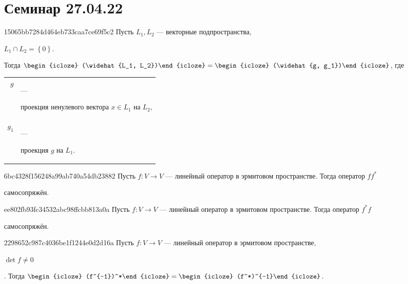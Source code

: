 \section{Семинар 27.04.22}
\begin{note}{15065bb7284d464eb733caa7ce69f5c2}
    Пусть \({ L_1, L_2 }\) --- векторные подпространства,\: \begin{icloze}{5}\({ L_1 \cap L_2 = \left\{ 0 \right\} }\).\end{icloze}
    Тогда \({ \begin{icloze}{4}(\widehat{L_1, L_2})\end{icloze} = \begin{icloze}{3}(\widehat{g, g_1})\end{icloze} }\), где
    \begin{center}
        \begin{tabular}{rl}
            \({ g }\) &--- \begin{icloze}{1}проекция ненулевого вектора \({ x \in L_1 }\) на \({ L_2 }\),\end{icloze} \\
            \({ g_1 }\) &--- \begin{icloze}{2}проекция \({ g }\) на \({ L_1 }\).\end{icloze}
        \end{tabular}
    \end{center}
\end{note}

\begin{note}{6bc4328f156248a99ab740a54db23882}
    Пусть \({ f : V \to V }\) --- линейный оператор в эрмитовом пространстве.
    Тогда оператор \({ ff^* }\) \begin{icloze}{1}самосопряжён.\end{icloze}
\end{note}

\begin{note}{ee802fb93fc34532abc98ffcbb813a0a}
    Пусть \({ f : V \to V }\) --- линейный оператор в эрмитовом пространстве.
    Тогда оператор \({ f^*f }\) \begin{icloze}{1}самосопряжён.\end{icloze}
\end{note}

\begin{note}{2298652c987c4036be1f1244e0d2d16a}
    Пусть \({ f : V \to V }\) --- линейный оператор в эрмитовом пространстве,\: \begin{icloze}{3}\({ \det f \neq 0 }\)\end{icloze}.
    Тогда \({ \begin{icloze}{2}(f^{-1})^*\end{icloze} = \begin{icloze}{1}(f^*)^{-1}\end{icloze} }\).
\end{note}


